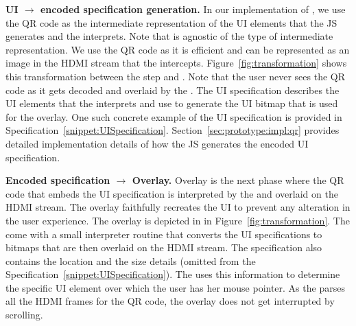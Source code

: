 % 


\begin{mylist}
\item \textbf{UI $\rightarrow$ encoded specification generation.} In our implementation of \name, we use the QR code as the intermediate representation of the UI elements that the \name JS generates and the \device interprets. Note that \name is agnostic of the type of intermediate representation. We use the QR code as it is efficient and can be represented as an image in the HDMI stream that the \device intercepts. Figure~\ref{fig:transformation} shows this transformation between the step \one and \two. Note that the user never sees the QR code as it gets decoded and overlaid by the \device. The UI specification describes the UI elements that the \device interprets and use to generate the UI bitmap that is used for the overlay. One such concrete example of the UI specification is provided in Specification~\ref{snippet:UISpecification}. Section~\ref{sec:prototype:impl:qr} provides detailed implementation details of how the \name JS generates the encoded UI specification. 

\item \textbf{Encoded specification $\rightarrow$ Overlay.} Overlay is the next phase where the QR code that embeds the UI specification is interpreted by the \device and overlaid on the HDMI stream. The overlay faithfully recreates the UI to prevent any alteration in the user experience. The \device overlay is depicted in \three in Figure~\ref{fig:transformation}. The \device come with a small interpreter routine that converts the UI specifications to bitmaps that are then overlaid on the HDMI stream. The specification also contains the location and the size details (omitted from the Specification~\ref{snippet:UISpecification}). The \device uses this information to determine the specific UI element over which the user has her mouse pointer. As the \device parses all the HDMI frames for the QR code, the overlay does not get interrupted by scrolling.
\end{mylist}

